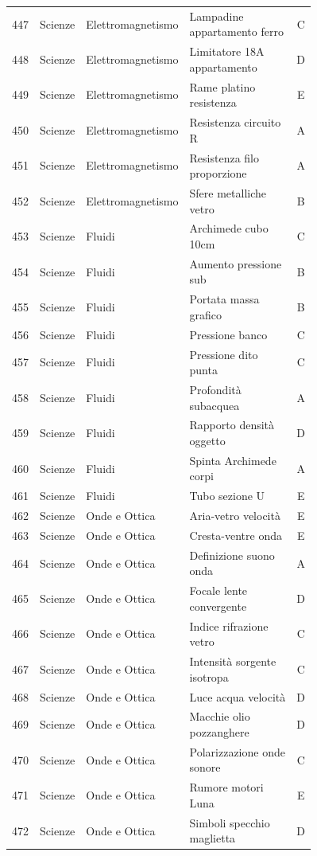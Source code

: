 \documentclass[20pt, a4paper]{article}
\begin{document}
\begin{longtable}{@{}r>{\raggedright\arraybackslash}p{0.14\linewidth}>{\raggedright\arraybackslash}p{0.20\linewidth}>{\raggedright\arraybackslash}p{0.42\linewidth}c@{}}
447 & Scienze & Elettromagnetismo & Lampadine appartamento ferro & C \\
448 & Scienze & Elettromagnetismo & Limitatore 18A appartamento & D \\
449 & Scienze & Elettromagnetismo & Rame platino resistenza & E \\
450 & Scienze & Elettromagnetismo & Resistenza circuito R & A \\
451 & Scienze & Elettromagnetismo & Resistenza filo proporzione & A \\
452 & Scienze & Elettromagnetismo & Sfere metalliche vetro & B \\
453 & Scienze & Fluidi & Archimede cubo 10cm & C \\
454 & Scienze & Fluidi & Aumento pressione sub & B \\
455 & Scienze & Fluidi & Portata massa grafico & B \\
456 & Scienze & Fluidi & Pressione banco & C \\
457 & Scienze & Fluidi & Pressione dito punta & C \\
458 & Scienze & Fluidi & Profondità subacquea & A \\
459 & Scienze & Fluidi & Rapporto densità oggetto & D \\
460 & Scienze & Fluidi & Spinta Archimede corpi & A \\
461 & Scienze & Fluidi & Tubo sezione U & E \\
462 & Scienze & Onde e Ottica & Aria-vetro velocità & E \\
463 & Scienze & Onde e Ottica & Cresta-ventre onda & E \\
464 & Scienze & Onde e Ottica & Definizione suono onda & A \\
465 & Scienze & Onde e Ottica & Focale lente convergente & D \\
466 & Scienze & Onde e Ottica & Indice rifrazione vetro & C \\
467 & Scienze & Onde e Ottica & Intensità sorgente isotropa & C \\
468 & Scienze & Onde e Ottica & Luce acqua velocità & D \\
469 & Scienze & Onde e Ottica & Macchie olio pozzanghere & D \\
470 & Scienze & Onde e Ottica & Polarizzazione onde sonore & C \\
471 & Scienze & Onde e Ottica & Rumore motori Luna & E \\
472 & Scienze & Onde e Ottica & Simboli specchio maglietta & D \\

\end{longtable}
\end{document}
